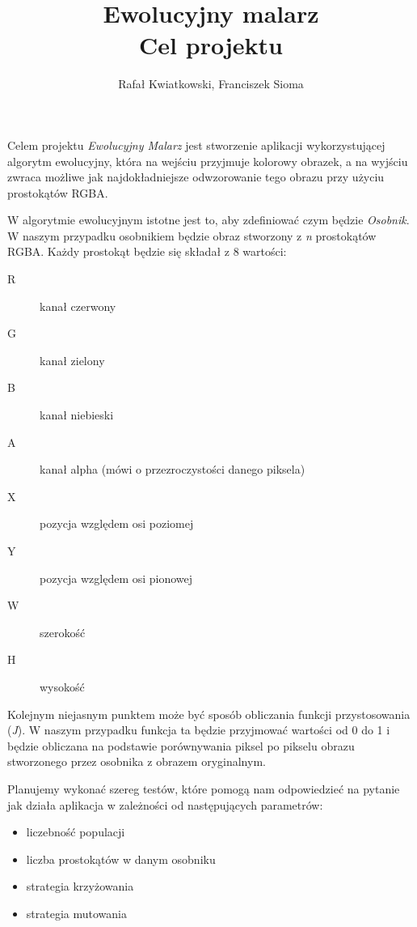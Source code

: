 \documentclass{article}
\title{Ewolucyjny malarz \\ \large Cel projektu}
\author{Rafał Kwiatkowski, Franciszek Sioma}
\begin{document}
\maketitle

Celem projektu {\it Ewolucyjny Malarz} jest stworzenie aplikacji wykorzystującej algorytm ewolucyjny, która na wejściu przyjmuje kolorowy obrazek, a na wyjściu zwraca możliwe jak najdokładniejsze odwzorowanie tego obrazu przy użyciu prostokątów RGBA. 

W algorytmie ewolucyjnym istotne jest to, aby zdefiniować czym będzie {\it Osobnik}. W naszym przypadku osobnikiem będzie obraz stworzony z {\it n} prostokątów RGBA. Każdy prostokąt będzie się składał z 8 wartości: 
\begin{description}
    \item[R] kanał czerwony
    \item[G] kanał zielony
    \item[B] kanał niebieski
    \item[A] kanał alpha (mówi o przezroczystości danego piksela)
    \item[X] pozycja względem osi poziomej
    \item[Y] pozycja względem osi pionowej
    \item[W] szerokość
    \item[H] wysokość       
\end{description}

Kolejnym niejasnym punktem może być sposób obliczania funkcji przystosowania ({\it J}). W naszym przypadku funkcja ta będzie przyjmować wartości od 0 do 1 i będzie obliczana na podstawie porównywania piksel po pikselu obrazu stworzonego przez osobnika z obrazem oryginalnym.

Planujemy wykonać szereg testów, które pomogą nam odpowiedzieć na pytanie jak działa aplikacja w zależności od następujących parametrów:
\begin{itemize}
    \item liczebność populacji
    \item liczba prostokątów w danym osobniku
    \item strategia krzyżowania
    \item strategia mutowania
\end{itemize}
\end{document}
